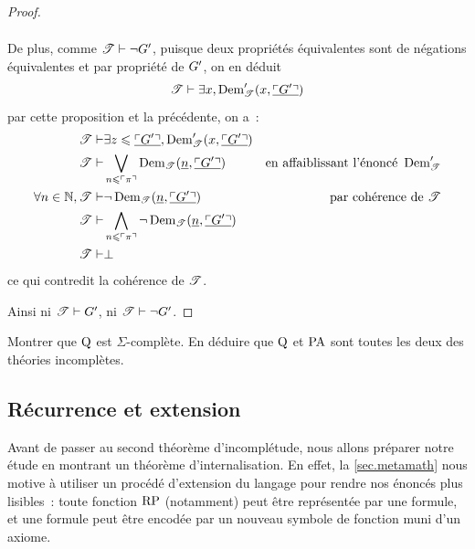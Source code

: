 \begin{proof}
\begin{itemize}
\begin{align*}
    \end{align*}
    De plus, comme $\mathscr T \vdash \lnot G'$, puisque deux
    propriétés équivalentes sont de négations équivalentes et par propriété de
    $G'$, on en déduit
    \[\mathscr T\vdash\exists x,\operatorname{Dem}'_{\mathscr T}(x,\underline{\ulcorner G'\urcorner})\]
    par cette proposition et la précédente, on a~:
    \begin{align*}
      \mathscr T \vdash & \exists z \leqslant \underline{\ulcorner G'\urcorner},
      \operatorname{Dem}'_{\mathscr T}(x, \underline{\ulcorner G'\urcorner}) \\
      \mathscr T \vdash & \bigvee_{n \leqslant \ulcorner\pi\urcorner}
      \operatorname{Dem}_{\mathscr T}(\underline{n}, \underline{\ulcorner G'\urcorner})
      & \text{en affaiblissant l'énoncé }\operatorname{Dem}'_{\mathscr T}\\
      \forall n \in \mathbb N, \mathscr T \vdash & \lnot \operatorname{Dem}_{\mathscr T}(\underline{n},
      \underline{\ulcorner G'\urcorner}) & \text{par cohérence de }\mathscr T \\
      \mathscr T \vdash & \bigwedge_{n \leqslant \ulcorner\pi\urcorner}\lnot\operatorname{Dem}_{\mathscr T}
      (\underline{n},\underline{\ulcorner G'\urcorner}) \\
      \mathscr T \vdash & \bot 
    \end{align*}
    ce qui contredit la cohérence de $\mathscr T$.
  \end{itemize}
  
  Ainsi ni $\mathscr T \vdash G'$, ni $\mathscr T \vdash \lnot G'$.
\end{proof}

\begin{exercise}
  Montrer que $\operatorname{Q}$ est $\Sigma$-complète. En déduire que
  $\operatorname{Q}$ et $\operatorname{PA}$ sont toutes les deux des théories incomplètes.
\end{exercise}

\subsection{Récurrence et extension}\label{subsec.ext.PA}

Avant de passer au second théorème d'incomplétude, nous allons préparer notre
étude en montrant un théorème d'internalisation.
En effet, la \cref{sec.metamath} nous motive à utiliser un procédé d'extension
du langage pour rendre nos énoncés plus lisibles~: toute fonction $\operatorname{RP}$
(notamment) peut être représentée par une formule, et une formule peut être
encodée par un nouveau symbole de fonction muni d'un axiome.

